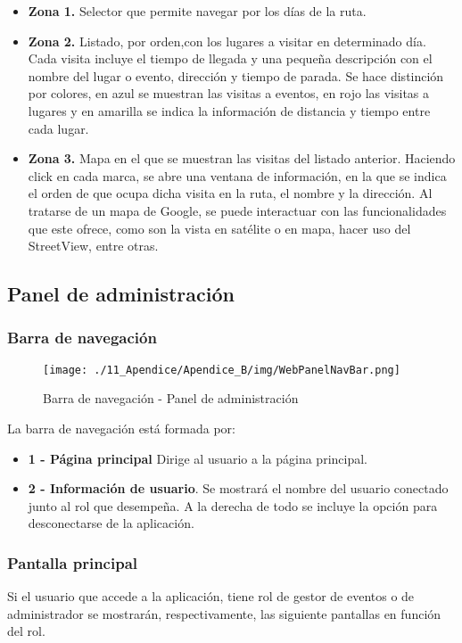 \begin{itemize}
	\item \textbf{Zona 1. }Selector que permite navegar por los días de la ruta.
	\item \textbf{Zona 2. }Listado, por orden,con los lugares a visitar en determinado día. Cada visita incluye el tiempo de llegada y una pequeña descripción con el nombre del lugar o evento, dirección y tiempo de parada. Se hace distinción por colores, en azul se muestran las visitas a eventos, en rojo las visitas a lugares y en amarilla se indica la información de distancia y tiempo entre cada lugar.
	\item \textbf{Zona 3. }Mapa en el que se muestran las visitas del listado anterior. Haciendo click en cada marca, se abre una ventana de información, en la que se indica el orden de que ocupa dicha visita en la ruta, el nombre y la dirección. Al tratarse de un mapa de Google, se puede interactuar con las funcionalidades que este ofrece, como son la vista en satélite o en mapa, hacer uso del StreetView, entre otras.
\end{itemize}


\subsection{Panel de administración}

\subsubsection*{Barra de navegación}

\begin{figure}[H]
\centering
\texttt{[image: ./11\_Apendice/Apendice\_B/img/WebPanelNavBar.png]}
\caption{Barra de navegación - Panel de administración}
\end{figure}

La barra de navegación está formada por:

\begin{itemize}
	\item \textbf{1 - Página principal} Dirige al usuario a la página principal.
	\item \textbf{2 - Información de usuario}. Se mostrará el nombre del usuario conectado junto al rol que desempeña. A la derecha de todo se incluye la opción para desconectarse de la aplicación.
\end{itemize}


\subsubsection*{Pantalla principal}
Si el usuario que accede a la aplicación, tiene rol de gestor de eventos o de administrador se mostrarán, respectivamente, las siguiente pantallas en función del rol.

